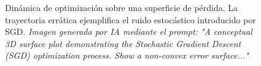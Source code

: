 \documentclass[12pt]{article}
\begin{document}
\begin{figure}[h!]
    \centering
    \caption{Dinámica de optimización sobre una superficie de pérdida. La trayectoria errática ejemplifica el ruido estocástico introducido por SGD. \textit{Imagen generada por IA mediante el prompt: "A conceptual 3D surface plot demonstrating the Stochastic Gradient Descent (SGD) optimization process. Show a non-convex error surface..."}}
    \label{fig:sgd}
\end{figure}
\end{document}
